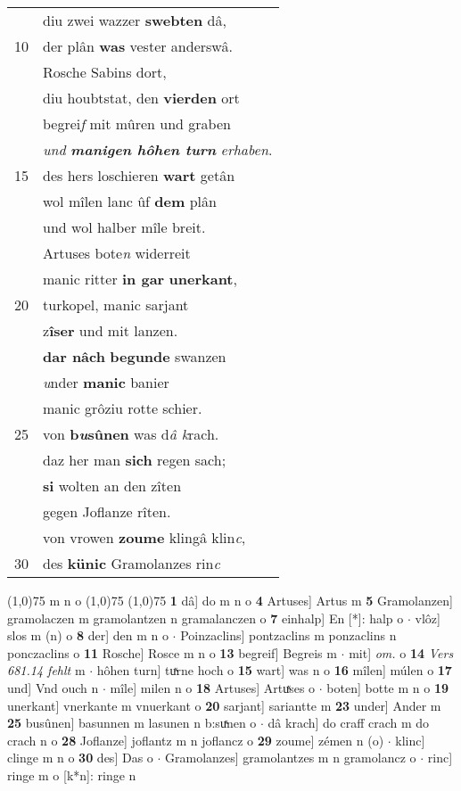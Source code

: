 \documentclass[8pt,a4paper,notitlepage]{article}
\begin{document}
\begin{table}[ht]
\begin{minipage}[t]{0.5\linewidth}
\begin{tabular}{rl}
 & diu zwei wazzer \textbf{swebten} dâ,\\ 
10 & der plân \textbf{was} vester anderswâ.\\ 
 & Rosche Sabins dort,\\ 
 & diu houbtstat, den \textbf{vierden} ort\\ 
 & begrei\textit{f} mit mûren und graben\\ 
 & \textit{und} \textit{\textbf{manigen hôhen turn}} \textit{erhaben}.\\ 
15 & des hers loschieren \textbf{wart} getân\\ 
 & wol mîlen lanc ûf \textbf{dem} plân\\ 
 & und wol halber mîle breit.\\ 
 & Artuses bote\textit{n} widerreit\\ 
 & manic ritter \textbf{in gar} \textbf{unerkant},\\ 
20 & turkopel, manic sarjant\\ 
 & z\textbf{îser} und mit lanzen.\\ 
 & \textbf{dar nâch} \textbf{begunde} swanzen\\ 
 & \textit{u}nder \textbf{manic} banier\\ 
 & manic grôziu rotte schier.\\ 
25 & von \textbf{b\textit{u}sûnen} was d\textit{â k}rach.\\ 
 & daz her man \textbf{sich} regen sach;\\ 
 & \textbf{si} wolten an den zîten\\ 
 & gegen Joflanze rîten.\\ 
 & von vrowen \textbf{zoume} klingâ klin\textit{c},\\ 
30 & des \textbf{künic} Gramolanzes rin\textit{c}\\ 
\end{tabular}
\scriptsize
\line(1,0){75} \newline
m n o \newline
\line(1,0){75} \newline
\newline
\line(1,0){75} \newline
\textbf{1} dâ] do m n o \textbf{4} Artuses] Artus m \textbf{5} Gramolanzen] gramolaczen m gramolantzen n gramalanczen o \textbf{7} einhalp] En [*]: halp o  $\cdot$ vlôz] slos m (n) o \textbf{8} der] den m n o  $\cdot$ Poinzaclins] pontzaclins m ponzaclins n ponczaclins o \textbf{11} Rosche] Rosce m n o \textbf{13} begreif] Begreis m  $\cdot$ mit] \textit{om.} o \textbf{14} \textit{Vers 681.14 fehlt} m   $\cdot$ hôhen turn] tuͯrne hoch o \textbf{15} wart] was n o \textbf{16} mîlen] múlen o \textbf{17} und] Vnd ouch n  $\cdot$ mîle] milen n o \textbf{18} Artuses] Artuͯses o  $\cdot$ boten] botte m n o \textbf{19} unerkant] vnerkante m vnuerkant o \textbf{20} sarjant] sariantte m \textbf{23} under] Ander m \textbf{25} busûnen] basunnen m lasunen n b:suͯnen o  $\cdot$ dâ krach] do craff crach m do crach n o \textbf{28} Joflanze] joflantz m n joflancz o \textbf{29} zoume] zémen n (o)  $\cdot$ klinc] clinge m n o \textbf{30} des] Das o  $\cdot$ Gramolanzes] gramolantzes m n gramolancz o  $\cdot$ rinc] ringe m o [k*n]: ringe n \newline

\end{minipage}
\end{table}
\end{document}
